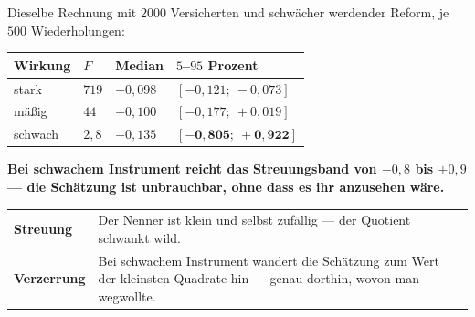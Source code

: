 \begin{warnung}
Dieselbe Rechnung mit $2000$ Versicherten und schwächer werdender Reform, je $500$ Wiederholungen:

\begin{center}
{\small
\renewcommand{\arraystretch}{1.48}
\begin{tabular}{@{}P{2.0cm}P{1.4cm}P{1.8cm}P{3.0cm}@{}}
\toprule
\textbf{Wirkung} & $F$ & \textbf{Median} & \textbf{$5$--$95$ Prozent}\\
\midrule
stark & $719$ & $-0{,}098$ & $[-0{,}121;\ -0{,}073]$\\
mäßig & $44$ & $-0{,}100$ & $[-0{,}177;\ +0{,}019]$\\
schwach & $2{,}8$ & $-0{,}135$ & $\mathbf{[-0{,}805;\ +0{,}922]}$\\
\bottomrule
\end{tabular}}
\end{center}

\begin{center}
\begin{minipage}{0.9\textwidth}
\textbf{Bei schwachem Instrument reicht das Streuungsband von $-0{,}8$ bis $+0{,}9$ --- die Schätzung ist unbrauchbar, ohne dass es ihr anzusehen wäre.}
\end{minipage}
\end{center}

\begin{center}
{\small
\renewcommand{\arraystretch}{1.52}
\begin{tabular}{@{}P{2.6cm}P{6.0cm}@{}}
\toprule
\textbf{Streuung} & Der Nenner ist klein und selbst zufällig --- der Quotient schwankt wild.\\
\textbf{Verzerrung} & Bei schwachem Instrument wandert die Schätzung zum Wert der kleinsten Quadrate hin --- genau dorthin, wovon man wegwollte.\\
\bottomrule
\end{tabular}}
\end{center}

\begin{center}
\begin{minipage}{0.88\textwidth}
\end{minipage}
\end{center}
\end{warnung}

